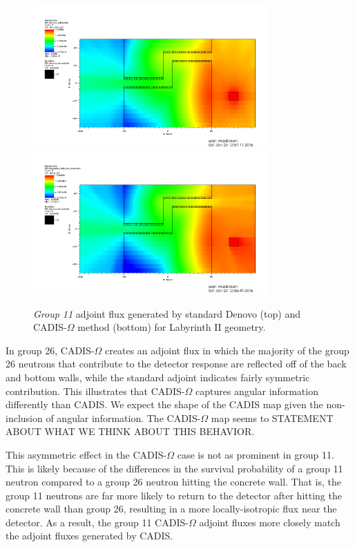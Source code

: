 \documentclass[12pt]{article}
\begin{document}
\begin{figure}
  \begin{center}
    \includegraphics[width=0.80\textwidth]{./images/maze2_adjoint_group11_adjusted.png}
    \includegraphics[width=0.80\textwidth]{./images/maze2_myflux_group11_adjusted.png}
    \caption[]{\label{fig::adjoint_fluxes_group11}\textit{Group 11} adjoint flux generated by standard Denovo (top) and CADIS-$\Omega$ method (bottom) for Labyrinth II geometry.}
  \end{center}
\end{figure}

In group 26, CADIS-$\Omega$ creates an adjoint flux in which the majority of the group 26 neutrons that contribute to the detector response are reflected off of the back and bottom walls, while the standard adjoint indicates fairly symmetric contribution. 
This illustrates that CADIS-$\Omega$ captures angular information differently than CADIS. 
We expect the shape of the CADIS map given the non-inclusion of angular information. 
The CADIS-$\Omega$ map seems to STATEMENT ABOUT WHAT WE THINK ABOUT THIS BEHAVIOR.

This asymmetric effect in the CADIS-$\Omega$ case is not as prominent in group 11. 
This is likely because of the differences in the survival probability of a group 11 neutron compared to a group 26 neutron hitting the concrete wall. 
That is, the group 11 neutrons are far more likely to return to the detector after hitting the concrete wall than group 26, 
 resulting in a more locally-isotropic flux near the detector. 
As a result, the group 11 CADIS-$\Omega$ adjoint fluxes more closely match the adjoint fluxes generated by CADIS. 
 
\end{document}
